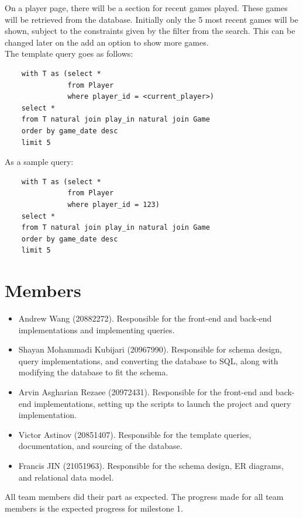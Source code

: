 \documentclass[11pt]{article}
\begin{document}
On a player page, there will be a section for recent games played. These games will be retrieved from the database. Initially only the 5 most recent games will be shown, subject to the constraints given by the filter from the search. This can be changed later on the add an option to show more games. \\

The template query goes as follows:

\begin{verbatim}
    with T as (select *
               from Player
               where player_id = <current_player>)
    select *
    from T natural join play_in natural join Game
    order by game_date desc
    limit 5
\end{verbatim}

As a sample query:

\begin{verbatim}
    with T as (select *
               from Player
               where player_id = 123)
    select *
    from T natural join play_in natural join Game
    order by game_date desc
    limit 5
\end{verbatim}

\section{Members}
\begin{itemize}
    \item Andrew Wang (20882272). Responsible for the front-end and back-end implementations and implementing queries.
    \item Shayan Mohammadi Kubijari (20967990). Responsible for schema design, query implementations, and converting the database to SQL, along with modifying the database to fit the schema.
    \item Arvin Asgharian Rezaee (20972431). Responsible for the front-end and back-end implementations, setting up the scripts to launch the project and query implementation.
    \item Victor Astinov (20851407). Responsible for the template queries, documentation, and sourcing of the database.
    \item Francis JIN (21051963). Responsible for the schema design, ER diagrams, and relational data model.
\end{itemize}

All team members did their part as expected. The progress made for all team members is the expected progress for milestone 1.
\end{document}
